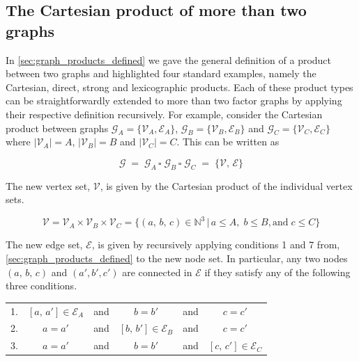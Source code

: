 \subsection{The Cartesian product of more than two graphs}

In \cref{sec:graph_products_defined} we gave the general definition of a product between two graphs and highlighted four standard examples, namely the Cartesian, direct, strong and lexicographic products. Each of these product types can be straightforwardly extended to more than two factor graphs by applying their respective definition recursively. For example, consider the Cartesian product between graphs $\mathcal{G}_A = \{\mathcal{V}_A, \mathcal{E}_A\}$, $\mathcal{G}_B = \{\mathcal{V}_B, \mathcal{E}_B\}$ and $\mathcal{G}_C = \{\mathcal{V}_C, \mathcal{E}_C\}$ where $|\mathcal{V}_A| = A$, $|\mathcal{V}_B| = B$ and $|\mathcal{V}_C| = C$. This can be written as 

\begin{equation}
    \mathcal{G} \; = \; \mathcal{G}_A \, \square \; \mathcal{G}_B \, \square \; \mathcal{G}_C \; = \; \{\mathcal{V}, \, \mathcal{E}\}
\end{equation}

The new vertex set, $\mathcal{V}$, is given by the Cartesian product of the individual vertex sets. 

\begin{equation}
    \mathcal{V} = \mathcal{V}_A \times \mathcal{V}_B \times \mathcal{V}_C = \{(a, \, b, \, c) \in \mathbb{N}^3 \, | \, a \leq A, \; b \leq B, \text{and} \;  c \leq C\}
\end{equation}

The new edge set, $\mathcal{E}$, is given by recursively applying conditions 1 and 7 from, \cref{sec:graph_products_defined} to the new node set. In particular, any two nodes $(a, \, b, \, c)$ and $(a', b', c')$ are connected in $\mathcal{E}$ if they satisfy any of the following three conditions. 

\vspace{0.5cm}

\begin{table}[h]
    \def\arraystretch{1.5}
    \centering
    \begin{tabular}{lclclc}
        1. & $[a, \, a'] \in \mathcal{E}_A$    & and & $b = b'$  & and & $c = c'$             \\
        2. & $a = a'$    & and & $[b, \, b'] \in \mathcal{E}_B$   & and & $c = c'$             \\
        3. & $a = a'$    & and & $b = b'$  & and & $[c, \, c'] \in \mathcal{E}_C$              \\
    \end{tabular}
\end{table}


